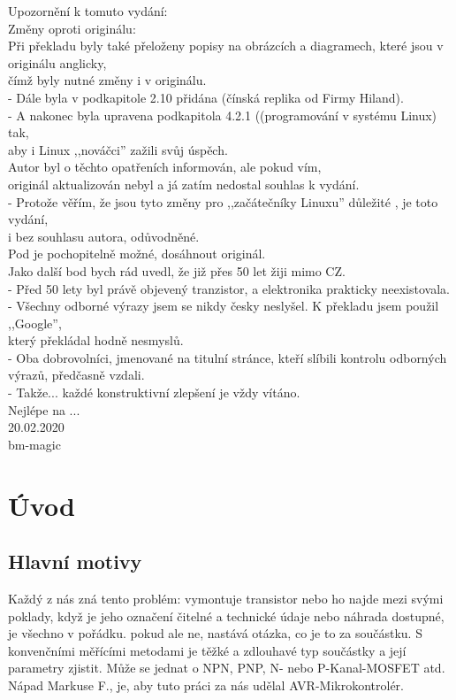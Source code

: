 Upozornění k tomuto vydání:
\vspace*{0.3cm}
\\Změny oproti originálu:
\\Při překladu byly také přeloženy popisy na obrázcích a diagramech, které jsou v originálu anglicky,
\\čímž byly nutné změny i v originálu. 
\\- Dále byla v podkapitole 2.10 přidána (čínská replika od Firmy Hiland).
\\- A nakonec byla upravena podkapitola 4.2.1 ((programování v systému Linux) tak,
\\aby i Linux ,,nováčci'' zažili svůj úspěch.
\vspace*{0.3cm}
\\Autor byl o těchto opatřeních informován, ale pokud vím,
\\originál aktualizován nebyl a já zatím nedostal souhlas k vydání.
\\ - Protože věřím, že jsou tyto změny pro ,,začátečníky Linuxu'' důležité , je toto vydání,
\\i bez souhlasu autora, odůvodněné.
\vspace*{0.3cm}
\\Pod \cite{khk} je pochopitelně možné, dosáhnout originál.
\vspace*{0.2cm}
\\Jako další bod bych rád uvedl, že již přes 50 let žiji mimo CZ.
\\- Před 50 lety byl právě objevený tranzistor, a elektronika prakticky neexistovala.
\\- Všechny odborné výrazy jsem se nikdy česky neslyšel. K překladu jsem použil ,,Google'',
\\který překládal hodně nesmyslů.
\\- Oba dobrovolníci, jmenované na titulní stránce, kteří slíbili kontrolu odborných výrazů, předčasně vzdali.
\\- Takže... každé konstruktivní zlepšení je vždy vítáno.
\\Nejlépe na \cite{Svetelektro}... 
\vspace*{0.2cm}
\\20.02.2020
\\ bm-magic 

\newpage
\section*{Úvod}

\subsection*{Hlavní motivy}
Každý z nás zná tento problém: vymontuje transistor nebo ho najde mezi svými poklady,
když je jeho označení čitelné a technické údaje nebo náhrada dostupné, je všechno v pořádku.
pokud ale ne, nastává otázka, co je to za součástku.
S konvenčními měřícími metodami je těžké a zdlouhavé typ součástky a její parametry zjistit.
Může se jednat o NPN, PNP, N- nebo P-Kanal-MOSFET atd. 
Nápad Markuse F., je, aby tuto práci za nás udělal AVR-Mikrokontrolér.

